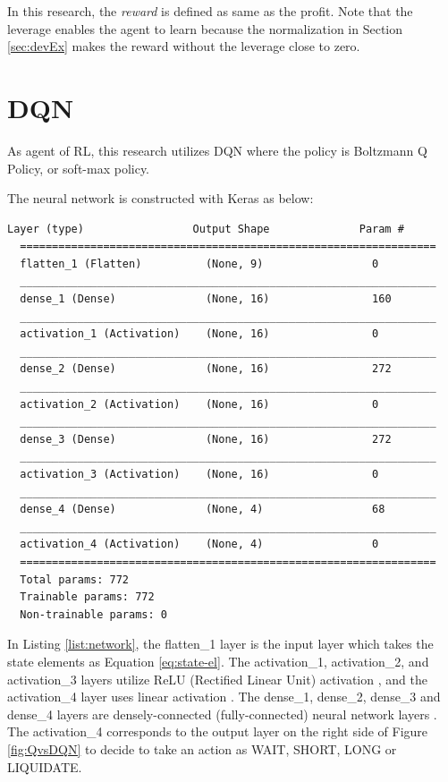 In this research, the {\it reward} is defined as same as the profit. Note that the leverage enables the agent to learn because the normalization in Section \ref{sec:devEx} makes the reward without the leverage close to zero.

\section{DQN}
\label{sec:DQN}
As agent of RL, this research utilizes DQN \cite{mnih2013playing} where the policy is Boltzmann Q Policy, or soft-max policy.

The neural network is constructed with Keras as below:
\begin{lstlisting}[caption=Neural network structure with Keras, label=list:network]
  Layer (type)                 Output Shape              Param #   
  =================================================================
  flatten_1 (Flatten)          (None, 9)                 0         
  _________________________________________________________________
  dense_1 (Dense)              (None, 16)                160       
  _________________________________________________________________
  activation_1 (Activation)    (None, 16)                0         
  _________________________________________________________________
  dense_2 (Dense)              (None, 16)                272       
  _________________________________________________________________
  activation_2 (Activation)    (None, 16)                0         
  _________________________________________________________________
  dense_3 (Dense)              (None, 16)                272       
  _________________________________________________________________
  activation_3 (Activation)    (None, 16)                0         
  _________________________________________________________________
  dense_4 (Dense)              (None, 4)                 68        
  _________________________________________________________________
  activation_4 (Activation)    (None, 4)                 0         
  =================================================================
  Total params: 772
  Trainable params: 772
  Non-trainable params: 0
\end{lstlisting}

In Listing \ref{list:network}, the flatten\_1 layer is the input layer which takes the state elements as Equation \ref{eq:state-el}. The activation\_1, activation\_2, and activation\_3 layers utilize ReLU (Rectified Linear Unit) activation \cite{relu}, and the activation\_4 layer uses linear activation \cite{linear}. The dense\_1, dense\_2, dense\_3 and dense\_4 layers are densely-connected (fully-connected) neural network layers \cite{dense}. The activation\_4 corresponds to the output layer on the right side of Figure \ref{fig:QvsDQN} to decide to take an action as WAIT, SHORT, LONG or LIQUIDATE.

